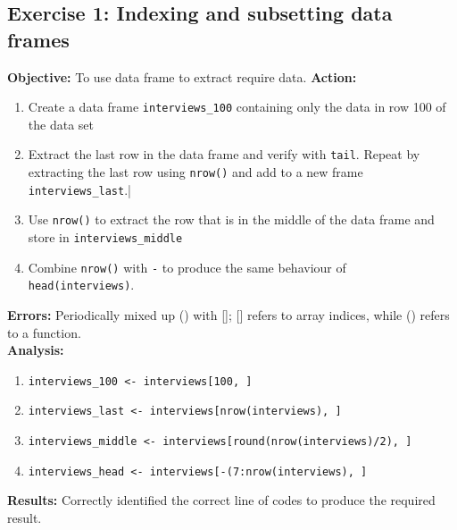 \documentclass{article}
\begin{document}
\subsection{Exercise 1: Indexing and subsetting data frames}
\textbf{Objective:} To use data frame to extract require data.      
\textbf{Action:}
\begin{enumerate}
    \item Create a data frame \verb|interviews_100| containing only the data in row 100 of the data set
    \item Extract the last row in the data frame and verify with \verb|tail|. Repeat by extracting the last row using \verb|nrow()| and add to a new frame\\ \verb|interviews_last|.|
    \item Use \verb|nrow()| to extract the row that is in the middle of the data frame and store in \verb|interviews_middle|
    \item Combine \verb|nrow()| with \verb|-| to produce the same behaviour of \\\verb|head(interviews)|.
\end{enumerate}
\textbf{Errors:} Periodically mixed up () with []; [] refers to array indices, while () refers to a function.\\       
\textbf{Analysis:}
\begin{enumerate}
    \item \verb|interviews_100 <- interviews[100, ]|
    \item \verb|interviews_last <- interviews[nrow(interviews), ]|
    \item \verb|interviews_middle <- interviews[round(nrow(interviews)/2), ]|
    \item \verb|interviews_head <- interviews[-(7:nrow(interviews), ]|
\end{enumerate}
\textbf{Results:} Correctly identified the correct line of codes to produce the required result.

\end{document}

